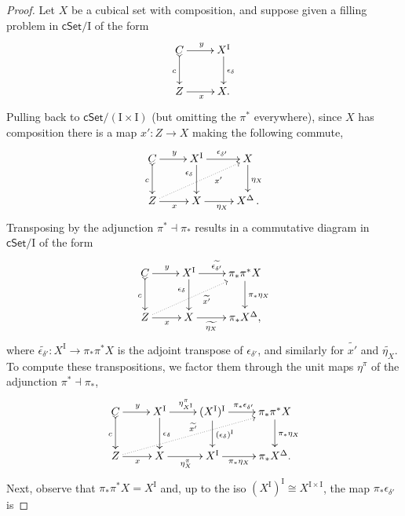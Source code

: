 \documentclass[12pt]{article}
\newcommand{\cSet}{\ensuremath{\mathsf{cSet}}}
\newcommand{\ra}{\ensuremath{\rightarrow}}
\newcommand{\I}{\ensuremath{\mathrm{I}}}
\theoremstyle{remark}
\theoremstyle{definition}
\begin{document}
\begin{proof}
Let $X$ be a cubical set with composition, and suppose given a filling problem in $\cSet/\I$  of the form
\begin{equation}\label{diagram:compimpfill}
\xymatrix{
C \ar@{>->}[d]_{c} \ar[r]^y  & X^\I \ar[d]^{\epsilon_\delta} \\
Z \ar[r]_x & X.
}
\end{equation}
Pulling back to $\cSet/(\I\times\I)$ (but omitting the $\pi^*$ everywhere), since $X$ has composition there is a map $x' : Z \ra X$ making the following commute, 
\begin{equation}\label{diagram:compimpfill2}
\xymatrix{
C \ar@{>->}[d]_{c} \ar[r]^y  & X^\I \ar[d]_>>>>>>>{\epsilon_\delta} \ar[r]^{\epsilon_{\delta'}} 
	&  X \ar[d]^{\eta_X}\\
Z  \ar@{..>}[rru]_>>>>>>>>>{x'} \ar[r]_x & X \ar[r]_{\eta_X} & X^\Delta \,.
}
\end{equation}
%
Transposing by the adjunction $\pi^* \dashv {\pi}_*$ results in a commutative diagram in $\cSet/\I$ of the form
\begin{equation}\label{diagram:compimpfill3}
\xymatrix{
C \ar@{>->}[d]_{c} \ar[r]^y  & X^\I \ar[d]_>>>>>>>{\epsilon_\delta} \ar[r]^{\widetilde{\epsilon_{\delta'}}} 
	&  \pi_*\pi^*X \ar[d]^{\pi_*\eta_X} \\
Z \ar[r]_x \ar@{..>}[rru]_>>>>>>>>>{\widetilde{x'}} & X\ar[r]_-{\widetilde{\eta_X}} & \pi_*X^\Delta,
}
\end{equation}
where $\widetilde{\epsilon_{\delta'}} : X^\I \ra \pi_*\pi^*X$ is the adjoint transpose of $\epsilon_{\delta'}$, and similarly for $\widetilde{x'}$ and $\widetilde{\eta_X}$.  To compute these transpositions, we factor them through the unit maps $\eta^\pi$ of the adjunction $\pi^* \dashv {\pi}_*$,
\begin{equation}\label{diagram:compimpfill4}
\xymatrix{
C \ar@{>->}[d]_{c} \ar[r]^y  & X^\I \ar[d]^{\epsilon_\delta} \ar[r]^{\eta^{\pi}_{X^\I}} 
	&  (X^\I)^\I  \ar[d]^{(\epsilon_\delta)^\I} \ar[r]^{\pi_*{\epsilon_{\delta'}}}  &  \pi_*\pi^*X   \ar[d]^{\pi_*\eta_X} \\
Z \ar[r]_x \ar@{..>}[rrru]^{\widetilde{x'}} & X \ar[r]_{\eta^\pi_X} 
	& X^\I \ar[r]_-{\pi_*\eta_X} & \pi_*X^\Delta.
}
\end{equation}
%
Next, observe that $\pi_*\pi^*X = X^\I$ and, up to the iso $(X^\I)^\I \cong X^{\I\times\I}$, the map $\pi_*{\epsilon_{\delta'}}$ is

\end{proof}
\end{document}

